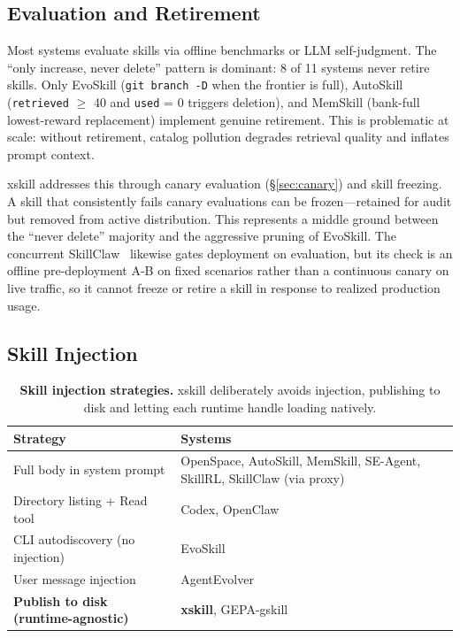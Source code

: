 \documentclass{article}
\begin{document}
\subsection{Evaluation and Retirement}

Most systems evaluate skills via offline benchmarks or LLM self-judgment. The ``only increase, never delete'' pattern is dominant: 8 of 11 systems never retire skills. Only EvoSkill (\texttt{git branch -D} when the frontier is full), AutoSkill (\texttt{retrieved} $\geq$ 40 and \texttt{used} = 0 triggers deletion), and MemSkill (bank-full lowest-reward replacement) implement genuine retirement. This is problematic at scale: without retirement, catalog pollution degrades retrieval quality and inflates prompt context.

xskill addresses this through canary evaluation (\S\ref{sec:canary}) and skill freezing. A skill that consistently fails canary evaluations can be frozen---retained for audit but removed from active distribution. This represents a middle ground between the ``never delete'' majority and the aggressive pruning of EvoSkill. The concurrent SkillClaw~\citep{amapml2026skillclaw} likewise gates deployment on evaluation, but its check is an offline pre-deployment A-B on fixed scenarios rather than a continuous canary on live traffic, so it cannot freeze or retire a skill in response to realized production usage.

\subsection{Skill Injection}

\begin{table}[t]
\centering
\caption{\textbf{Skill injection strategies.} xskill deliberately avoids injection, publishing to disk and letting each runtime handle loading natively.}
\label{tab:injection}
\small
\begin{tabular}{@{}ll@{}}
\toprule
\textbf{Strategy} & \textbf{Systems} \\
\midrule
Full body in system prompt & OpenSpace, AutoSkill, MemSkill, SE-Agent, SkillRL, SkillClaw (via proxy) \\
Directory listing + Read tool & Codex, OpenClaw \\
CLI autodiscovery (no injection) & EvoSkill \\
User message injection & AgentEvolver \\
\textbf{Publish to disk (runtime-agnostic)} & \textbf{xskill}, GEPA-gskill \\
\bottomrule
\end{tabular}
\end{table}
\end{document}
